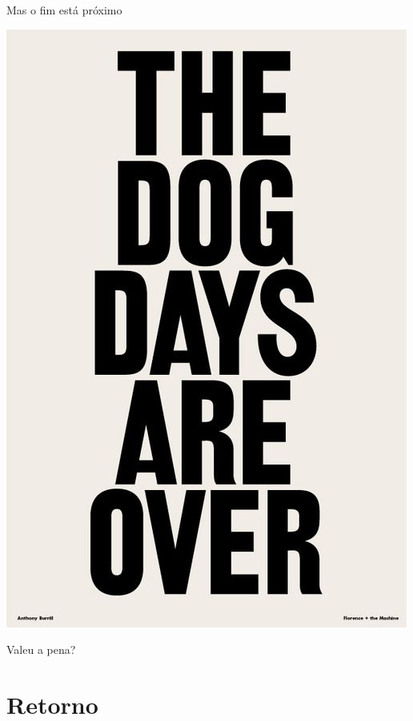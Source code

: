 \documentclass{beamer}
\begin{document}
\begin{frame}{Mas o fim está próximo}
  \begin{center}
    \includegraphics[height=.75\textheight]{Encerramento/dogdaysareover}

    \vfill
  \end{center}
\end{frame}

\begin{frame}
  \begin{center}
    Valeu a pena?

    \vfill
  \end{center}
\end{frame}

\section{Retorno}
\end{document}
